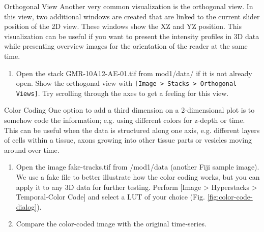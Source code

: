 \begin{taskbox}{Orthogonal View}
Another very common visualization is the orthogonal view. In this view, two additional windows are created that are linked to the current slider position of the 2D view. These windows show the XZ and YZ position. This visualization can be useful if you want to present the intensity profiles in 3D data while presenting overview images for the orientation of the reader at the same time.

\begin{enumerate}
	\item Open the stack GMR-10A12-AE-01.tif from mod1/data/ if it is not already open. Show the orthogonal view with \texttt{[Image > Stacks > Orthogonal Views]}. Try scrolling through the axes to get a feeling for this view.
\end{enumerate}

\end{taskbox}

\newpage
\begin{taskbox}{Color Coding}
One option to add a third dimension on a 2-dimensional plot is to somehow code the information; e.g. using different colors for z-depth or time. This can be useful when the data is structured along one axis, e.g. different layers of cells within a tissue, axons growing into other tissue parts or vesicles moving around over time.

\begin{enumerate}
	\item Open the image fake-tracks.tif from /mod1/data (another Fiji sample image). We use a fake file to better illustrate how the color coding works, but you can apply it to any 3D data for further testing. Perform [Image > Hyperstacks > Temporal-Color Code] and select a LUT of your choice (Fig. \ref{fig:color-code-dialog}).
	
	\begin{minipage}[t]{\linewidth}
		\begin{center}
		\medskip
		\label{fig:color-code-dialog}
		\end{center}
	\end{minipage}
	
	\item Compare the color-coded image with the original time-series.
\end{enumerate}

\end{taskbox}

